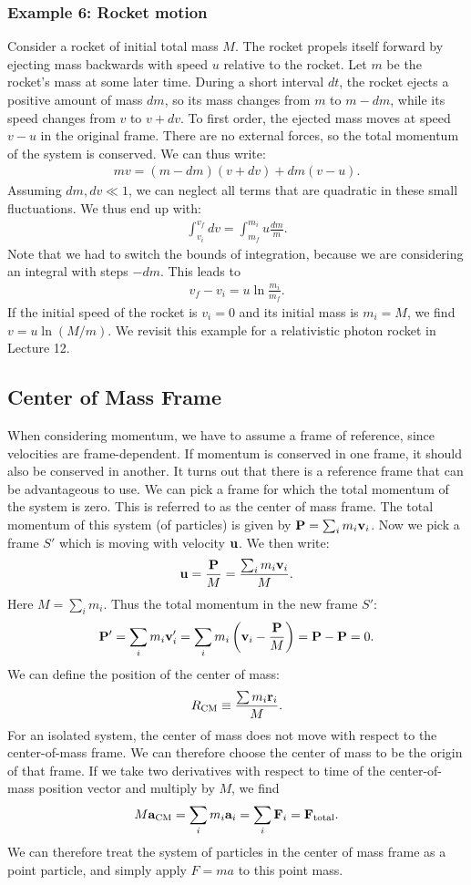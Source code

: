 \documentclass[12pt]{article}
\newcommand{\be}{\begin{eqnarray}}
\newcommand{\ee}{\end{eqnarray}}
\begin{document}
\subsubsection*{Example 6: Rocket motion}
Consider a rocket of initial total mass $M$. The rocket propels itself forward by ejecting mass backwards with speed $u$ relative to the rocket. Let $m$ be the rocket's mass at some later time. During a short interval $dt$, the rocket ejects a positive amount of mass $dm$, so its mass changes from $m$ to $m-dm$, while its speed changes from $v$ to $v+dv$. To first order, the ejected mass moves at speed $v-u$ in the original frame. There are no external forces, so the total momentum of the system is conserved. We can thus write:
\be
mv = (m - dm)(v+dv) + dm(v-u). 
\ee
Assuming $dm, dv \ll 1$, we can neglect all terms that are quadratic in these small fluctuations. We thus end up with:
\be
\int_{v_i}^{v_f} dv =  \int_{m_f}^{m_i} u \frac{dm}{m}.
\ee
Note that we had to switch the bounds of integration, because we are considering an integral with steps $-dm$. This leads to 
\be
v_f-v_i = u \ln \frac{m_i}{m_f}.
\ee
If the initial speed of the rocket is $v_i=0$ and its initial mass is $m_i=M$, we find $v=u\ln(M/m)$. We revisit this example for a relativistic photon rocket in Lecture 12.

\subsection{Center of Mass Frame}

When considering momentum, we have to assume a frame of reference, since velocities are frame-dependent. If momentum is conserved in one frame, it should also be conserved in another. It turns out that there is a reference frame that can be advantageous to use. We can pick a frame for which the total momentum of the system is zero. This is referred to as the center of mass frame. The total momentum of this system (of particles) is given by ${\bf P}  = \sum_i m_i {\bf v}_i$. Now we pick a frame $S'$ which is moving with velocity ${\bf u}$. We then write:
\be
{\bf u} = \frac{\bf P}{M} = \frac{\sum_i m_i {\bf v}_i}{M}.
\ee
Here $M = \sum_i m_i$. Thus the total momentum in the new frame $S'$: 
\be
{\bf P}' = \sum_i m_i {\bf v}_i' = \sum_i m_i\left({\bf v}_i - \frac{\bf P}{M}\right) = {\bf P} - {\bf P} = 0.
\ee
We can define the position of the center of mass:
\be
R_{\rm CM} \equiv \frac{\sum m_i {\bf r}_i}{M}.
\ee
For an isolated system, the center of mass does not move with respect to the center-of-mass frame. We can therefore choose the center of mass to be the origin of that frame. If we take two derivatives with respect to time of the center-of-mass position vector and multiply by $M$, we find
\be
M {\bf a}_{\rm CM} = \sum_i m_i {\bf a}_i = \sum_i {\bf F}_i  = {\bf F}_{\rm total}.
\ee
We can therefore treat the system of particles in the center of mass frame as a point particle, and simply apply $F = ma$ to this point mass. 
\end{document}
